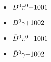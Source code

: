 
 \begin{multicols}{3} 
 \begin{itemize}
 \item $ D^{0} \pi^{0} \hfill{+1001}$
 \item $ D^{0} \gamma \hfill{+1002}$
 \end{itemize} 
 \end{multicols} 

 \begin{multicols}{3} 
 \begin{itemize}
 \item $ \bar{D}^{0} \pi^{0} \hfill{-1001}$
 \item $ \bar{D}^{0} \gamma \hfill{-1002}$
 \end{itemize} 
 \end{multicols} 
